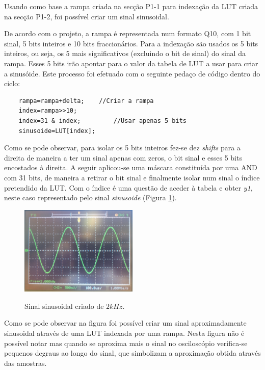 \documentclass[11pt]{article}
\numberwithin{equation}{section}
\begin{document}
Usando como base a rampa criada na secção P1-1 para indexação da LUT criada na secção P1-2, foi possível criar um sinal  sinusoidal.                                                                              

De acordo com o projeto, a rampa é representada num formato Q10, com 1 bit sinal, 5 bits inteiros e 10 bits fraccionários. 
Para a indexação são usados os 5 bits inteiros, ou seja, os 5 mais significativos (excluindo o bit de sinal) do sinal da rampa. Esses 5 bits irão apontar para o valor da tabela de LUT a usar para criar a sinusóide. 
Este processo foi efetuado com o seguinte pedaço de código dentro do ciclo:

\begin{lstlisting}
	rampa=rampa+delta;    //Criar a rampa
	index=rampa>>10;
	index=31 & index;         //Usar apenas 5 bits
	sinusoide=LUT[index];
\end{lstlisting}

Como se pode observar, para isolar os 5 bits inteiros fez-se dez \textit{shifts} para a direita de maneira a ter um sinal apenas com zeros, o bit sinal e esses 5 bits encostados à direita. A seguir aplicou-se uma máscara constituída por uma AND com 31 bits, de maneira a retirar o bit sinal e finalmente isolar num sinal o índice pretendido da LUT. Com o índice é uma questão de aceder à tabela e obter \textit{y1}, neste caso representado pelo sinal \textit{sinusoide} (Figura \ref{fig:sen2k}).

\begin{figure}[H]
	\centering
	\includegraphics[width=0.5\textwidth]{./P1_1seno}~\\
	\caption{Sinal sinusoidal criado de $ 2 kHz $.}
	\label{fig:sen2k}
\end{figure}

Como se pode observar na figura foi possível criar um sinal aproximadamente sinusoidal através de uma LUT indexada por uma rampa. Nesta figura não é possível notar mas quando se aproxima mais o sinal no osciloscópio verifica-se pequenos degraus ao longo do sinal, que simbolizam a aproximação obtida através das amostras.
\end{document}
